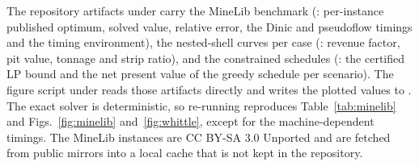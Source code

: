 \documentclass[journal]{IEEEtran}
\begin{document}
The repository artifacts under  carry the MineLib benchmark (:
per-instance published optimum, solved value, relative error, the Dinic and pseudoflow timings and the timing
environment), the nested-shell curves per case (: revenue factor, pit value, tonnage and
strip ratio), and the constrained schedules (: the certified LP bound and the net present
value of the greedy schedule per scenario). The figure script under  reads
those artifacts directly and writes the plotted values to . The exact
solver is deterministic, so re-running reproduces Table~\ref{tab:minelib} and Figs.~\ref{fig:minelib}
and~\ref{fig:whittle}, except for the machine-dependent timings. The MineLib instances are CC BY-SA 3.0 Unported and
are fetched from public mirrors into a local cache that is not kept in the repository.

\balance
\end{document}
